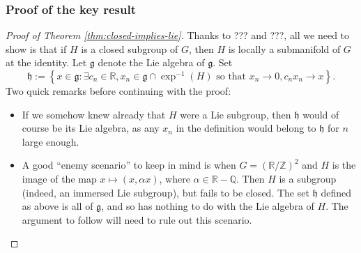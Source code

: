 \documentclass[reqno]{amsart} 
\begin{document}
\subsubsection{Proof of the key result}
\label{sec:org5574bc9}
\begin{proof}
[Proof of Theorem \ref{thm:closed-implies-lie}]
  Thanks to ??? and ???, all we need to show is that if $H$ is a closed subgroup of $G$, then $H$ is locally a submanifold of $G$ at the identity.  Let $\mathfrak{g}$ denote the Lie algebra of $\mathfrak{g}$.  Set
  \begin{equation*}
    \mathfrak{h} := \left\{ x \in \mathfrak{g} : \exists c_n \in \mathbb{R}, x_n \in \mathfrak{g} \cap \exp^{-1}(H) \text{ so that } x_n \rightarrow 0, c_n x_n \rightarrow x \right\}.
  \end{equation*}
  Two quick remarks before continuing with the proof:
  \begin{itemize}
  \item If we somehow knew already that $H$ were a Lie subgroup, then $\mathfrak{h}$ would of course be its Lie algebra, as any $x_n$ in the definition would belong to $\mathfrak{h}$ for $n$ large enough.
  \item A good ``enemy scenario'' to keep in mind is when $G = (\mathbb{R} /\mathbb{Z})^2$ and $H$ is the image of the map $x \mapsto (x, \alpha x)$, where $\alpha \in \mathbb{R} - \mathbb{Q}$.  Then $H$ is a subgroup (indeed, an immersed Lie subgroup), but fails to be closed.  The set $\mathfrak{h}$ defined as above is all of $\mathfrak{g}$, and so has nothing to do with the Lie algebra of $H$.  The argument to follow will need to rule out this scenario.
  \end{itemize}


\end{proof}
\end{document}
